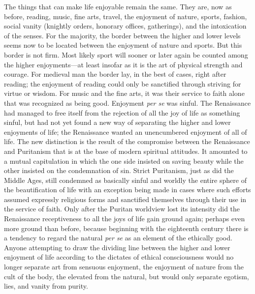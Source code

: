 The things that can make life enjoyable remain the same. They are, now
as before, reading, music, fine arts, travel, the enjoyment of nature,
sports, fashion, social vanity (knightly orders, honorary offices,
gatherings), and the intoxication of the senses. For the majority, the
border between the higher and lower levels seems now to be located
between the enjoyment of nature and sports. But this border is not firm.
Most likely sport will sooner or later again be counted among the higher
enjoyments---at least insofar as it is the art of physical strength and
courage. For medieval man the border lay, in the best of cases, right
after reading; the enjoyment of reading could only be sanctified through
striving for virtue or wisdom. For music and the fine arts, it was their
service to faith alone that was recognized as being good. Enjoyment
\emph{per se} was sinful. The Renaissance had managed to free itself
from the rejection of all the joy of life as something sinful, but had
not yet found a new way of separating the higher and lower enjoyments of
life; the Renaissance wanted an unencumbered enjoyment of all of life.
The new distinction is the result of the compromise between the
Renaissance and Puritanism that is at the base of modern spiritual
attitudes. It amounted to a mutual capitulation in which the one side
insisted on saving beauty while the other insisted on the condemnation
of sin. Strict Puritanism, just as did the Middle Ages, still condemned
\protect\hypertarget{09_Chapter_Two__THE_CRAVING_FOR_A_M.xhtmlux5cux23page_41}{}{}as
basically sinful and worldly the entire sphere of the beautification of
life with an exception being made in cases where such efforts assumed
expressly religious forms and sanctified themselves through their use in
the service of faith. Only after the Puritan worldview lost its
intensity did the Renaissance receptiveness to all the joys of life gain
ground again; perhaps even more ground than before, because beginning
with the eighteenth century there is a tendency to regard the natural
\emph{per se} as an element of the ethically good. Anyone attempting to
draw the dividing line between the higher and lower enjoyment of life
according to the dictates of ethical consciousness would no longer
separate art from sensuous enjoyment, the enjoyment of nature from the
cult of the body, the elevated from the natural, but would only separate
egotism, lies, and vanity from purity.

